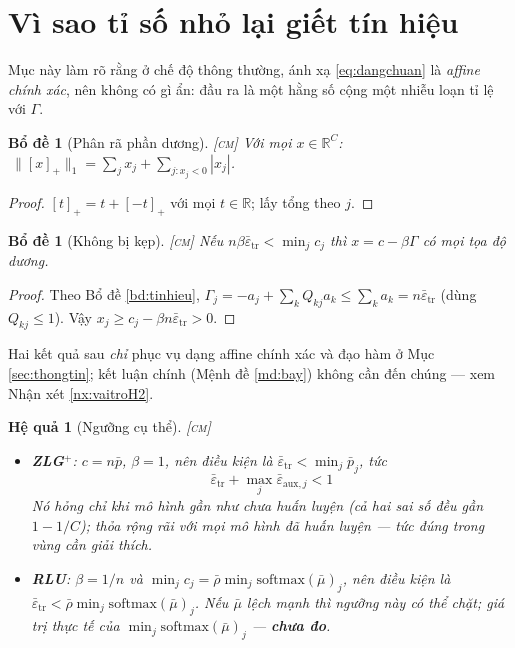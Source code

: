 \documentclass[11pt,a4paper]{article}
\newtheorem{bode}[dinhly]{Bổ đề}
\newtheorem{hequa}[dinhly]{Hệ quả}
\theoremstyle{remark}
\newcommand{\R}{\mathbb{R}}
\newcommand{\pos}[1]{\left[#1\right]_+}
\newcommand{\epstr}{\bar\varepsilon_{\mathrm{tr}}}
\begin{document}
\section{Vì sao tỉ số nhỏ lại giết tín hiệu}
\label{sec:affine}

Mục này làm rõ rằng ở chế độ thông thường, ánh xạ \eqref{eq:dangchuan} là
\emph{affine chính xác}, nên không có gì ẩn: đầu ra là một hằng số cộng một
nhiễu loạn tỉ lệ với $\Gamma$.

\begin{bode}[Phân rã phần dương]
\label{bd:phanra}
\textsc{[cm]}\; Với mọi $x\in\R^C$:
$\ \|\pos{x}\|_1=\sum_j x_j+\sum_{j:x_j<0}|x_j|$.
\end{bode}

\begin{proof}
$[t]_+=t+[-t]_+$ với mọi $t\in\R$; lấy tổng theo $j$.
\end{proof}

\begin{bode}[Không bị kẹp]
\label{bd:khongkep}
\textsc{[cm]}\; Nếu $n\beta\epstr<\min_j c_j$ thì $x=c-\beta\Gamma$ có mọi
tọa độ dương.
\end{bode}

\begin{proof}
Theo Bổ đề \ref{bd:tinhieu}, $\Gamma_j=-a_j+\sum_k Q_{kj}a_k
\le\sum_k a_k=n\epstr$ (dùng $Q_{kj}\le1$). Vậy
$x_j\ge c_j-\beta n\epstr>0$.
\end{proof}

Hai kết quả sau \emph{chỉ} phục vụ dạng affine chính xác và đạo hàm ở Mục
\ref{sec:thongtin}; kết luận chính (Mệnh đề \ref{md:bay}) không cần đến chúng
--- xem Nhận xét \ref{nx:vaitroH2}.

\begin{hequa}[Ngưỡng cụ thể]
\label{hq:nguong}
\textsc{[cm]}\;
\begin{itemize}
\item \textbf{ZLG$^+$}: $c=n\bar p$, $\beta=1$, nên điều kiện là
  $\epstr<\min_j\bar p_j$, tức
  \[
  \boxed{\;\epstr+\max_j\bar\varepsilon_{\mathrm{aux},j}<1\;}
  \]
  Nó hỏng chỉ khi mô hình gần như chưa huấn luyện (cả hai sai số đều gần
  $1-1/C$); thỏa rộng rãi với mọi mô hình đã huấn luyện --- tức đúng trong
  vùng cần giải thích.
\item \textbf{RLU}: $\beta=1/n$ và $\min_j c_j=\bar\rho\min_j\mathrm{softmax}(\bar\mu)_j$,
  nên điều kiện là $\epstr<\bar\rho\min_j\mathrm{softmax}(\bar\mu)_j$. Nếu
  $\bar\mu$ lệch mạnh thì ngưỡng này có thể chặt; giá trị thực tế của
  $\min_j\mathrm{softmax}(\bar\mu)_j$ --- \textbf{chưa đo}.
\end{itemize}
\end{hequa}
\end{document}
